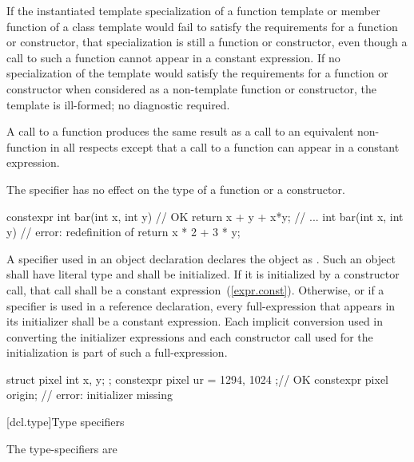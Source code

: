 \exitexample

\pnum
If the instantiated template specialization of a  function
template
or member function of a class template
would fail to satisfy the requirements for a 
function or  constructor,
that specialization is still a  function or 
constructor, even though a call to such a function cannot appear in a constant
expression. If no specialization of the template would satisfy the
requirements for a  function or  constructor
when considered as a non-template function or constructor, the template is
ill-formed; no diagnostic
required.

\pnum
A call to a  function produces the same result as a call to an equivalent
non- function in all respects except that a call to a 
function can appear in a constant expression.

\pnum
The  specifier has no
effect on the type of a  function or a  constructor.  \enterexample
\begin{codeblock}
constexpr int bar(int x, int y) // OK 
    { return x + y + x*y; } 
// ... 
int bar(int x, int y)           // error: redefinition of 
    { return x * 2 + 3 * y; } 
\end{codeblock}
\exitexample

\pnum
A  specifier used in an object
declaration declares the object as .
Such an object
shall have literal type and
shall be initialized.
If it is initialized by a constructor call,
that call shall be a constant expression~(\ref{expr.const}).
Otherwise,
or if a  specifier is used in a reference declaration,
every full-expression that appears in its initializer shall be a constant expression. \enternote Each
implicit conversion used in converting the initializer expressions and each constructor call
used for the initialization is part of such a full-expression. \exitnote
\enterexample
\begin{codeblock}
struct pixel { 
  int x, y; 
}; 
constexpr pixel ur = { 1294, 1024 };// OK 
constexpr pixel origin;             // error: initializer missing 
\end{codeblock}
\exitexample

[dcl.type]{Type specifiers}%

\pnum
The type-specifiers are

